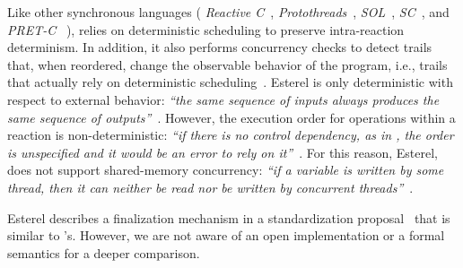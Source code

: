 Like other synchronous languages
(%
    \emph{Reactive C}~\cite{rp.rc},                 %
    \emph{Protothreads}~\cite{wsn.protothreads},    %
    \emph{SOL}~\cite{wsn.sol},                      %
    \emph{SC}~\cite{rp.synchc},                     %
    and
    \emph{PRET-C}~\cite{rp.pretc}%
),
\CEU relies on deterministic scheduling to preserve intra-reaction determinism.
%
In addition, it also performs concurrency checks to detect trails that, when
reordered, change the observable behavior of the program, i.e., trails that
actually rely on deterministic scheduling~\cite{ceu.sensys13}.
%
Esterel is only deterministic with respect to external behavior: \emph{``the
same sequence of inputs always produces the same sequence of
outputs''}~\cite{esterel.primer}.
%
However, the execution order for operations within a reaction is
non-deterministic: \emph{``if there is no control dependency, as in
,
the order is unspecified and it would be an error to rely on
it''}~\cite{esterel.primer}.
%
For this reason, Esterel, does not support shared-memory concurrency:
\emph{``if a variable is written by some thread, then it can neither be read
nor be written by concurrent threads''}~\cite{esterel.primer}.

Esterel describes a finalization mechanism in a standardization
proposal~\cite{esterel.v7} that is similar to \CEU's.
However, we are not aware of an open implementation or a formal semantics for a
deeper comparison.


